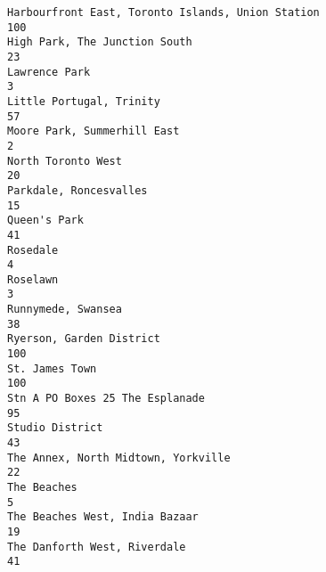 \documentclass[11pt]{article}
\begin{document}
\begin{tcolorbox}[breakable, size=fbox, boxrule=.5pt, pad at break*=1mm, opacityfill=0]
\begin{Verbatim}[commandchars=\\\{\}]
Harbourfront East, Toronto Islands, Union Station                     100
High Park, The Junction South                                          23
Lawrence Park                                                           3
Little Portugal, Trinity                                               57
Moore Park, Summerhill East                                             2
North Toronto West                                                     20
Parkdale, Roncesvalles                                                 15
Queen's Park                                                           41
Rosedale                                                                4
Roselawn                                                                3
Runnymede, Swansea                                                     38
Ryerson, Garden District                                              100
St. James Town                                                        100
Stn A PO Boxes 25 The Esplanade                                        95
Studio District                                                        43
The Annex, North Midtown, Yorkville                                    22
The Beaches                                                             5
The Beaches West, India Bazaar                                         19
The Danforth West, Riverdale                                           41


\end{Verbatim}
\end{tcolorbox}
\end{document}
